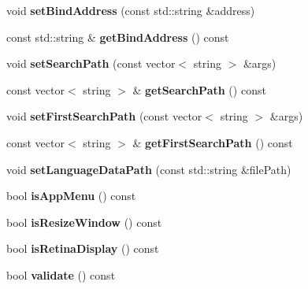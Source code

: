 \begin{DoxyCompactItemize}
void {\bfseries set\+Bind\+Address} (const std\+::string \&address)
\item 
\mbox{\label{classProjectConfig_affb5dc4f9897a424e060b0c6fefb357c}} 
const std\+::string \& {\bfseries get\+Bind\+Address} () const
\item 
\mbox{\label{classProjectConfig_abf4ad24ee28afe5ed49798c05e967cdf}} 
void {\bfseries set\+Search\+Path} (const vector$<$ string $>$ \&args)
\item 
\mbox{\label{classProjectConfig_a1b716c254e6aca6a80072e6ccdaa2518}} 
const vector$<$ string $>$ \& {\bfseries get\+Search\+Path} () const
\item 
\mbox{\label{classProjectConfig_ad0878b745a111fdd1e125a5023b0cf77}} 
void {\bfseries set\+First\+Search\+Path} (const vector$<$ string $>$ \&args)
\item 
\mbox{\label{classProjectConfig_afbb6236b6d6fc3c0b68472aa33ab0e26}} 
const vector$<$ string $>$ \& {\bfseries get\+First\+Search\+Path} () const
\item 
\mbox{\label{classProjectConfig_a0b3380ef217cb66a2ab6af3b47957d06}} 
void {\bfseries set\+Language\+Data\+Path} (const std\+::string \&file\+Path)
\item 
\mbox{\label{classProjectConfig_afa43c9d2cf01140e4aa4003c659a46f4}} 
bool {\bfseries is\+App\+Menu} () const
\item 
\mbox{\label{classProjectConfig_a7716cb58c4d9ab5d6b3ffe80a0d1ae53}} 
bool {\bfseries is\+Resize\+Window} () const
\item 
\mbox{\label{classProjectConfig_ab30b7ce48c01b65aefca0e0c8f8f91cf}} 
bool {\bfseries is\+Retina\+Display} () const
\item 
\mbox{\label{classProjectConfig_a5bfdb7343ddc67eb513752582e684602}} 
bool {\bfseries validate} () const
\item 
\mbox{\label{classProjectConfig_af3ce22b50510447ce5853c673db7faba}} 

\end{DoxyCompactItemize}
